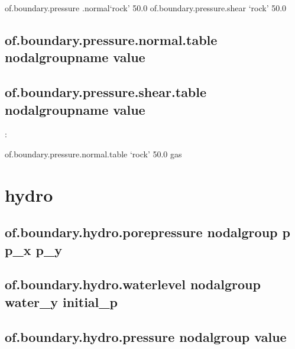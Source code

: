 \documentclass[letterpaper,10pt,english]{sphinxmanual}
\begin{document}
\begin{sphinxVerbatim}[commandchars=\\\{\}]
of.boundary.pressure .normal‘rock’ \PYGZhy{}50.0
of.boundary.pressure.shear ‘rock’ \PYGZhy{}50.0
\end{sphinxVerbatim}


\subsection{of.boundary.pressure.normal.table nodalgroupname value}
\label{\detokenize{rst_tutorials/command_line_guide:of-boundary-pressure-normal-table-nodalgroupname-value}}

\subsection{of.boundary.pressure.shear.table nodalgroupname value}
\label{\detokenize{rst_tutorials/command_line_guide:of-boundary-pressure-shear-table-nodalgroupname-value}}
:

\begin{sphinxVerbatim}[commandchars=\\\{\}]
of.boundary.pressure.normal.table ‘rock’ \PYGZhy{}50.0 gas
\end{sphinxVerbatim}


\section{hydro}
\label{\detokenize{rst_tutorials/command_line_guide:hydro}}

\subsection{of.boundary.hydro.porepressure nodalgroup p p\_x p\_y}
\label{\detokenize{rst_tutorials/command_line_guide:of-boundary-hydro-porepressure-nodalgroup-p-p-x-p-y}}

\subsection{of.boundary.hydro.waterlevel nodalgroup water\_y initial\_p}
\label{\detokenize{rst_tutorials/command_line_guide:of-boundary-hydro-waterlevel-nodalgroup-water-y-initial-p}}

\subsection{of.boundary.hydro.pressure nodalgroup value}
\label{\detokenize{rst_tutorials/command_line_guide:of-boundary-hydro-pressure-nodalgroup-value}}
\end{document}
